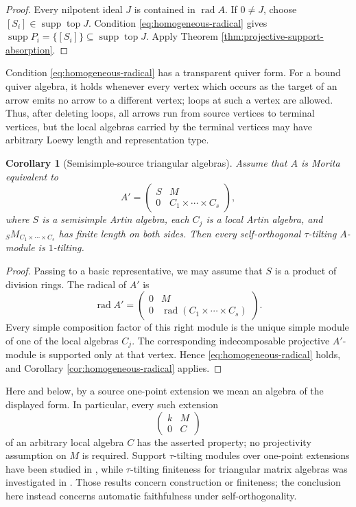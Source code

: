 \documentclass[a4paper,reqno]{amsart}
\newtheorem{corollary}[theorem]{Corollary}
\theoremstyle{definition}
\newcommand{\rad}{\operatorname{rad}\nolimits}
\newcommand{\topm}{\operatorname{top}\nolimits}
\newcommand{\supp}{\operatorname{supp}\nolimits}
\numberwithin{equation}{section}
\begin{document}
\begin{proof}
Every nilpotent ideal $J$ is contained in $\rad A$. If
$0\neq J$, choose $[S_i]\in\supp\topm J$. Condition
\eqref{eq:homogeneous-radical} gives
$\supp P_i=\{[S_i]\}\subseteq\supp\topm J$. Apply Theorem
\ref{thm:projective-support-absorption}.
\end{proof}

Condition \eqref{eq:homogeneous-radical} has a transparent quiver
form. For a bound quiver algebra, it holds whenever every vertex
which occurs as the target of an arrow emits no arrow to a different
vertex; loops at such a vertex are allowed. Thus, after deleting
loops, all arrows run from source vertices to terminal vertices, but
the local algebras carried by the terminal vertices may have
arbitrary Loewy length and representation type.

\begin{corollary}[Semisimple-source triangular algebras]
\label{cor:triangular-family}
Assume that $A$ is Morita equivalent to
\[
 A'=\begin{pmatrix}
       S&M\\
       0&C_1\times\cdots\times C_s
    \end{pmatrix},
\]
where $S$ is a semisimple Artin algebra, each $C_j$ is a local Artin
algebra, and ${}_SM_{C_1\times\cdots\times C_s}$ has finite length on
both sides. Then every
self-orthogonal $\tau$-tilting $A$-module is $1$-tilting.
\end{corollary}

\begin{proof}
Passing to a basic representative, we may assume that $S$ is a product
of division rings. The radical of $A'$ is
\[
 \rad A'=\begin{pmatrix}
            0&M\\
            0&\rad(C_1\times\cdots\times C_s)
          \end{pmatrix}.
\]
Every simple composition factor of this right module is the unique
simple module of one of the local algebras $C_j$. The corresponding
indecomposable projective $A'$-module is supported only at that
vertex. Hence \eqref{eq:homogeneous-radical} holds, and Corollary
\ref{cor:homogeneous-radical} applies.
\end{proof}

Here and below, by a source one-point extension we mean an algebra of
the displayed form. In particular, every such extension
\[
                    \begin{pmatrix}k&M\\0&C\end{pmatrix}
\]
of an arbitrary local algebra $C$ has the asserted property; no
projectivity assumption on $M$ is required. Support $\tau$-tilting
modules over one-point extensions have been studied in
\cite{GaoXie,Suarez}, while $\tau$-tilting finiteness for triangular
matrix algebras was investigated in \cite{AiharaHonma}. Those results
concern construction or finiteness; the conclusion here instead
concerns automatic faithfulness under self-orthogonality.
\end{document}
